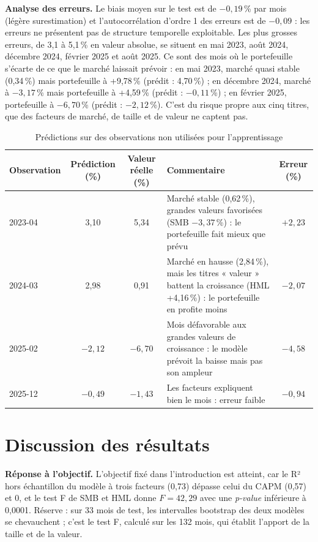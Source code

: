 \documentclass[11pt,a4paper]{article}
\newcommand{\pc}{\,\%}
\begin{document}
\textbf{Analyse des erreurs.} Le biais moyen sur le test est de $-0{,}19$\pc{} par mois (légère surestimation) et l'autocorrélation d'ordre 1 des erreurs est de $-0{,}09$ : les erreurs ne présentent pas de structure temporelle exploitable. Les plus grosses erreurs, de 3,1 à 5,1\pc{} en valeur absolue, se situent en mai 2023, août 2024, décembre 2024, février 2025 et août 2025. Ce sont des mois où le portefeuille s'écarte de ce que le marché laissait prévoir : en mai 2023, marché quasi stable (0,34\pc) mais portefeuille à +9,78\pc{} (prédit : 4,70\pc) ; en décembre 2024, marché à $-3{,}17$\pc{} mais portefeuille à +4,59\pc{} (prédit : $-0{,}11$\pc) ; en février 2025, portefeuille à $-6{,}70$\pc{} (prédit : $-2{,}12$\pc). C'est du risque propre aux cinq titres, que des facteurs de marché, de taille et de valeur ne captent pas.

\begin{table}[H]
\centering
\caption{Prédictions sur des observations non utilisées pour l'apprentissage}
\small
\begin{tabularx}{\textwidth}{|l|c|c|X|c|}
\hline
\textbf{Observation} & \textbf{Prédiction (\%)} & \textbf{Valeur réelle (\%)} & \textbf{Commentaire} & \textbf{Erreur (\%)}\\\hline
2023-04 & 3,10 & 5,34 & Marché stable (0,62\pc), grandes valeurs favorisées (SMB $-3{,}37$\pc) : le portefeuille fait mieux que prévu & $+2{,}23$\\\hline
2024-03 & 2,98 & 0,91 & Marché en hausse (2,84\pc), mais les titres « valeur » battent la croissance (HML +4,16\pc) : le portefeuille en profite moins & $-2{,}07$\\\hline
2025-02 & $-2{,}12$ & $-6{,}70$ & Mois défavorable aux grandes valeurs de croissance : le modèle prévoit la baisse mais pas son ampleur & $-4{,}58$\\\hline
2025-12 & $-0{,}49$ & $-1{,}43$ & Les facteurs expliquent bien le mois : erreur faible & $-0{,}94$\\\hline
\end{tabularx}
\end{table}

\section{Discussion des résultats}

\textbf{Réponse à l'objectif.} L'objectif fixé dans l'introduction est atteint, car le R² hors échantillon du modèle à trois facteurs (0,73) dépasse celui du CAPM (0,57) et 0, et le test F de SMB et HML donne $F=42{,}29$ avec une \textit{p-value} inférieure à 0,0001. Réserve : sur 33 mois de test, les intervalles bootstrap des deux modèles se chevauchent ; c'est le test F, calculé sur les 132 mois, qui établit l'apport de la taille et de la valeur.
\end{document}
